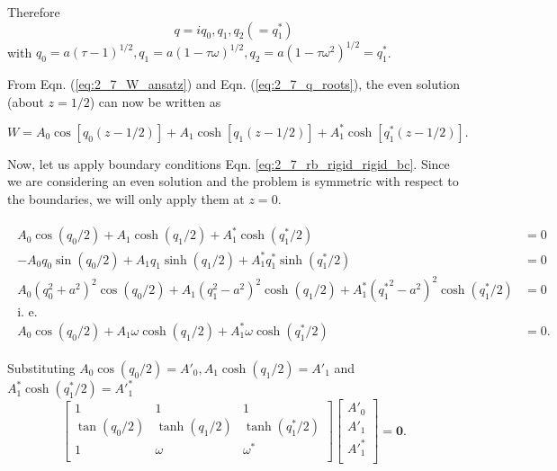 Therefore
\begin{equation}\label{eq:2_7_q_roots}
 q = iq_{0}, q_{1}, q_{2} ( =  q^{*}_{1})
\end{equation}
with $q_{0} = a (\tau - 1)^{1/2}, q_{1} = a (1 - \tau \omega)^{1/2}, q_{2} = a (1 - \tau \omega^{2})^{1/2} = q^{*}_{1}$. 

From Eqn. (\ref{eq:2_7_W_ansatz}) and Eqn. (\ref{eq:2_7_q_roots}), the even solution (about $z = 1/2$) can now be written as

\begin{equation}\label{eq:2_7_even_soln}
\boxed{
 W = A_{0} \cos{[q_{0}(z-1/2)]} + A_{1} \cosh{[q_{1}(z-1/2)]} + A^{*}_{1} \cosh{[q^{*}_{1}(z-1/2)]}
 }.
\end{equation}

Now, let us apply boundary conditions Eqn. \ref{eq:2_7_rb_rigid_rigid_bc}. Since we are considering an even solution and the problem is symmetric with respect to the boundaries, we will only apply them at $z= 0$.  

\begin{align}\label{eq:2_7_apply_bc_naive}
 \begin{split}
  A_{0} \cos{(q_{0}/2)} + A_{1}\cosh{(q_{1}/2)} + A^{*}_{1}\cosh{(q^{*}_{1}/2)} & = 0 \\
  -A_{0}q_{0}\sin{(q_{0}/2)} + A_{1}q_{1}\sinh{(q_{1}/2)} + A^{*}_{1}q^{*}_{1}\sinh{(q^{*}_{1}/2)} & = 0\\
  A_{0}(q_{0}^{2} + a^{2})^{2}\cos{(q_{0}/2)} + A_{1}(q_{1}^{2} - a^{2})^{2}\cosh{(q_{1}/2)} + A^{*}_{1}({q^{*}_{1}}^{2} - a^{2})^{2}\cosh{(q^{*}_{1}/2)}  & = 0 \\
  \textrm{i. e.}\\
  A_{0}\cos{(q_{0}/2)} + A_{1}\omega \cosh{(q_{1}/2)} + A^{*}_{1}\omega \cosh{(q^{*}_{1}/2)} & = 0.
 \end{split}
\end{align}

Substituting $A_{0} \cos{(q_{0}/2)} = A'_{0}, A_{1}\cosh{(q_{1}/2)} = A'_{1}$ and $A^{*}_{1}\cosh{(q^{*}_{1}/2)} = A'^{*}_{1}$
%
\begin{equation}\label{eq:2_7_matrix_form}
\begin{bmatrix}
1   &   1   &   1 \\
\tan({q_{0}/2})   &   \tanh({q_{1}/2})   &   \tanh({q^{*}_{1}/2})\\
1   &   \omega &   \omega^{*}\\
\end{bmatrix}
\begin{bmatrix}
 A'_{0}\\
 A'_{1}\\
 A'^{*}_{1}\\
\end{bmatrix} 
= \boldsymbol{0}.
\end{equation}

